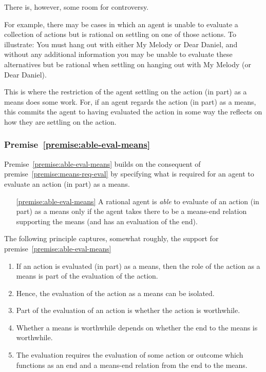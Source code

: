 \documentclass[10pt]{article}
\begin{document}
There is, however, some room for controversy.

For example, there may be cases in which an agent is unable to evaluate a collection of actions but is rational on settling on one of those actions.
To illustrate: You must hang out with either My Melody or Dear Daniel, and without any additional information you may be unable to evaluate these alternatives but be rational when settling on hanging out with My Melody (or Dear Daniel).

This is where the restriction of the agent settling on the action (in part) as a means does some work.
For, if an agent regards the action (in part) as a means, this commits the agent to having evaluated the action in some way the reflects on how they are settling on the action.

\newpage

\subsubsection{Premise~\ref{premise:able-eval-means}}

Premise~\ref{premise:able-eval-means} builds on the consequent of premise~\ref{premise:means-req-eval} by specifying what is required for an agent to evaluate an action (in part) as a means.

\begin{enumerate}
\item[\ref{premise:able-eval-means}] A rational agent is \emph{able} to evaluate of an action (in part) as a means only if the agent takes there to be a means-end relation supporting the means (and has an evaluation of the end).
\end{enumerate}

The following principle captures, somewhat roughly, the support for premise~\ref{premise:able-eval-means}

\principleMEdependence*

\begin{enumerate}
\item If an action is evaluated (in part) as a means, then the role of the action as a means is part of the evaluation of the action.
\item Hence, the evaluation of the action as a means can be isolated.
\item Part of the evaluation of an action is whether the action is worthwhile.
\item Whether a means is worthwhile depends on whether the end to the means is worthwhile.
\item The evaluation requires the evaluation of some action or outcome which functions as an end and a means-end relation from the end to the means.
\end{enumerate}
\end{document}

